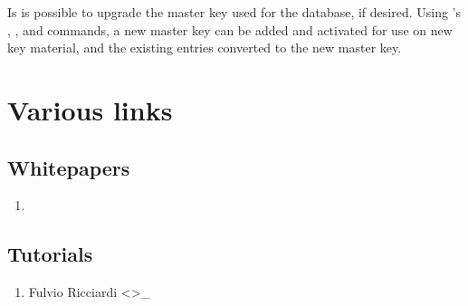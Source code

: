 \documentclass[letterpaper,10pt,english]{sphinxmanual}
\begin{document}
\sphinxAtStartPar
Is is possible to upgrade the master key used for the database, if
desired.  Using {\hyperref[\detokenize{admin/admin_commands/kdb5_util:kdb5-util-8}]{}}’s , , and
 commands, a new master key can be added
and activated for use on new key material, and the existing entries
converted to the new master key.

\sphinxstepscope


\chapter{Various links}
\label{\detokenize{admin/various_envs:various-links}}\label{\detokenize{admin/various_envs::doc}}

\section{Whitepapers}
\label{\detokenize{admin/various_envs:whitepapers}}\begin{enumerate}
%
\item {} 
\sphinxAtStartPar
{}

\end{enumerate}


\section{Tutorials}
\label{\detokenize{admin/various_envs:tutorials}}\begin{enumerate}
%
\item {} 
\sphinxAtStartPar
Fulvio Ricciardi  \textless{}\textgreater{}\_

\end{enumerate}
\end{document}
